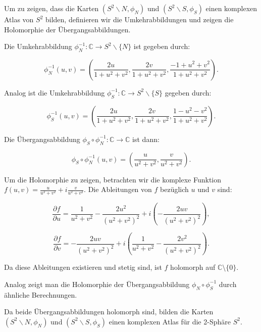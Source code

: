 Um zu zeigen, dass die Karten $\left(S^2 \backslash N, \phi_N\right)$ und $\left(S^2 \backslash S, \phi_S\right)$ einen komplexen Atlas von $S^2$ bilden, definieren wir die Umkehrabbildungen und zeigen die Holomorphie der Übergangsabbildungen.

Die Umkehrabbildung $\phi_N^{-1}: \mathbb{C} \to S^2 \backslash \{N\}$ ist gegeben durch:

\[
\phi_N^{-1}(u, v) = \left( \frac{2u}{1 + u^2 + v^2}, \frac{2v}{1 + u^2 + v^2}, \frac{-1 + u^2 + v^2}{1 + u^2 + v^2} \right).
\]

Analog ist die Umkehrabbildung $\phi_S^{-1}: \mathbb{C} \to S^2 \backslash \{S\}$ gegeben durch:

\[
\phi_S^{-1}(u, v) = \left( \frac{2u}{1 + u^2 + v^2}, \frac{2v}{1 + u^2 + v^2}, \frac{1 - u^2 - v^2}{1 + u^2 + v^2} \right).
\]

Die Übergangsabbildung $\phi_S \circ \phi_N^{-1}: \mathbb{C} \to \mathbb{C}$ ist dann:

\[
\phi_S \circ \phi_N^{-1}(u, v) = \left( \frac{u}{u^2 + v^2}, \frac{v}{u^2 + v^2} \right).
\]

Um die Holomorphie zu zeigen, betrachten wir die komplexe Funktion $f(u, v) = \frac{u}{u^2 + v^2} + i\frac{v}{u^2 + v^2}$. Die Ableitungen von $f$ bezüglich $u$ und $v$ sind:

\[
\frac{\partial f}{\partial u} = \frac{1}{u^2 + v^2} - \frac{2u^2}{(u^2 + v^2)^2} + i\left(-\frac{2uv}{(u^2 + v^2)^2}\right),
\]

\[
\frac{\partial f}{\partial v} = -\frac{2uv}{(u^2 + v^2)^2} + i\left(\frac{1}{u^2 + v^2} - \frac{2v^2}{(u^2 + v^2)^2}\right).
\]

Da diese Ableitungen existieren und stetig sind, ist $f$ holomorph auf $\mathbb{C} \setminus \{0\}$.

Analog zeigt man die Holomorphie der Übergangsabbildung $\phi_N \circ \phi_S^{-1}$ durch ähnliche Berechnungen.

Da beide Übergangsabbildungen holomorph sind, bilden die Karten $\left(S^2 \backslash N, \phi_N\right)$ und $\left(S^2 \backslash S, \phi_S\right)$ einen komplexen Atlas für die 2-Sphäre $S^2$.

